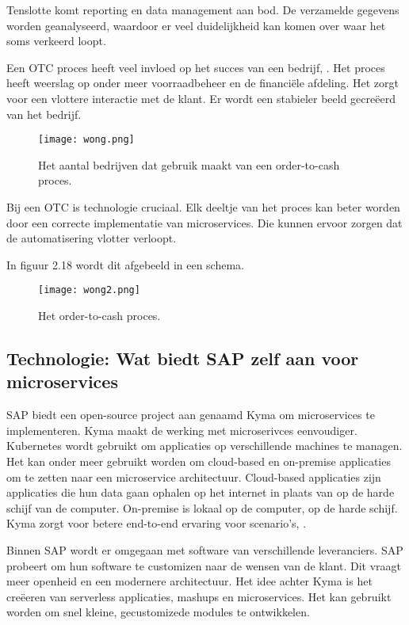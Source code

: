 Tenslotte komt reporting en data management aan bod. De verzamelde gegevens worden geanalyseerd, waardoor er veel duidelijkheid kan komen over waar het soms verkeerd loopt.

Een OTC proces heeft veel invloed op het succes van een bedrijf, \textcite{Wong2018}. Het proces heeft weerslag op onder meer voorraadbeheer en de financiële afdeling. Het zorgt voor een vlottere interactie met de klant. Er wordt een stabieler beeld gecreëerd van het bedrijf. 
 
\begin{figure}[h!]
	\texttt{[image: wong.png]}
	\caption{Het aantal bedrijven dat gebruik maakt van een order-to-cash proces. \textcite{Wong2018}}
	\centering
\end{figure}
  
Bij een OTC is technologie cruciaal. Elk deeltje van het proces kan beter worden door een correcte implementatie van microservices. Die kunnen ervoor zorgen dat de automatisering vlotter verloopt.

In figuur 2.18 wordt dit afgebeeld in een schema.
\begin{figure}[h!]
	\texttt{[image: wong2.png]}
	\caption{Het order-to-cash proces. \textcite{Wong2018}}
	\centering
\end{figure}


\subsection{Technologie: Wat biedt SAP zelf aan voor microservices}
SAP biedt een open-source project aan genaamd Kyma om microservices te implementeren.
Kyma maakt de werking met microserivces eenvoudiger. Kubernetes wordt gebruikt om applicaties op verschillende machines te managen. Het kan onder meer gebruikt worden om cloud-based en on-premise applicaties om te zetten naar een microservice architectuur. Cloud-based applicaties zijn applicaties die hun data gaan ophalen op het internet in plaats van op de harde schijf van de computer. On-premise is lokaal op de computer, op de harde schijf. Kyma zorgt voor betere end-to-end ervaring voor scenario's, \textcite{Kyma2019}.

Binnen SAP wordt er omgegaan met software van verschillende leveranciers. SAP probeert om hun software te customizen naar de  wensen van de klant. Dit vraagt meer openheid en een modernere architectuur. 
Het idee achter Kyma is het creëeren van serverless applicaties, mashups en microservices. Het kan  gebruikt worden om snel kleine, gecustomizede modules te ontwikkelen. 

